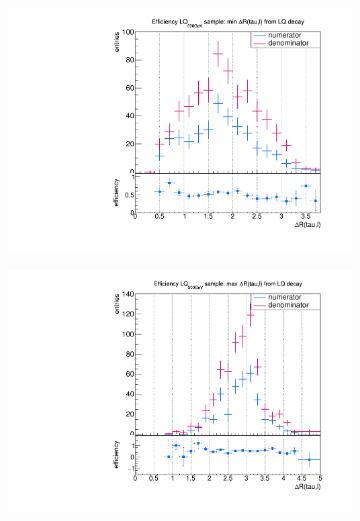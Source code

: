 \begin{figure}
  \centering
                \begin{subfigure}[t]{0.49\textwidth}
                \includegraphics[width=\textwidth]{figures/plots/LQ75/Divided_fromLQ_mindR_taulepton.pdf}
                \label{dRFromLQ:signal:taulepton:minLQ75}
                \end{subfigure}
                \begin{subfigure}[t]{0.49\textwidth}
                \includegraphics[width=\textwidth]{figures/plots/LQ75/Divided_maxdR_fromLQ_taulepton.pdf}

\end{subfigure}
\end{figure}
